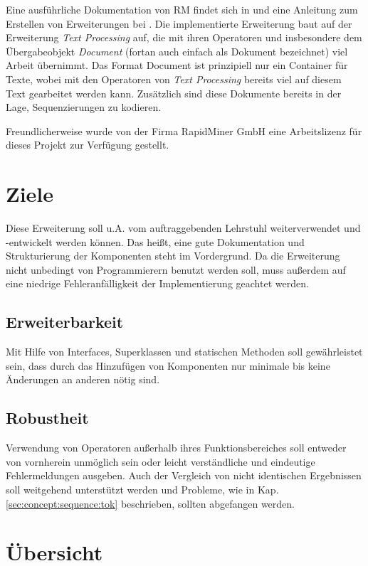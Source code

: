 Eine ausführliche Dokumentation von RM findet sich in \cite{rmdoc} und eine Anleitung zum Erstellen von Erweiterungen bei \cite{rmext}.
 Die implementierte Erweiterung baut auf der Erweiterung \textit{Text Processing} auf, die mit ihren Operatoren und insbesondere dem Übergabeobjekt \textit{Document} (fortan auch einfach als Dokument bezeichnet) viel Arbeit übernimmt. Das Format Document ist prinzipiell nur ein Container für Texte, wobei mit den Operatoren von \textit{Text Processing} bereits viel auf diesem Text gearbeitet werden kann. Zusätzlich sind diese Dokumente bereits in der Lage, Sequenzierungen zu kodieren.
 
 Freundlicherweise wurde von der Firma RapidMiner GmbH eine Arbeitslizenz für dieses Projekt zur Verfügung gestellt.

\section{Ziele}
\label{sec:impl:aims}
Diese Erweiterung soll u.A. vom auftraggebenden Lehrstuhl weiterverwendet und -entwickelt werden können. Das heißt, eine gute Dokumentation und Strukturierung der Komponenten steht im Vordergrund. Da die Erweiterung nicht unbedingt von Programmierern benutzt werden soll, muss außerdem auf eine niedrige Fehleranfälligkeit der Implementierung geachtet werden.
\subsection{Erweiterbarkeit}
Mit Hilfe von Interfaces, Superklassen und statischen Methoden soll gewährleistet sein, dass durch das Hinzufügen von Komponenten nur minimale bis keine Änderungen an anderen nötig sind.
\subsection{Robustheit}
Verwendung von Operatoren außerhalb ihres Funktionsbereiches soll entweder von vornherein unmöglich sein oder leicht verständliche und eindeutige Fehlermeldungen ausgeben. Auch der Vergleich von nicht identischen Ergebnissen soll weitgehend unterstützt werden und Probleme, wie in Kap. \ref{sec:concept:sequence:tok} beschrieben, sollten abgefangen werden.

\section{Übersicht}
\label{sec:impl:structure}

